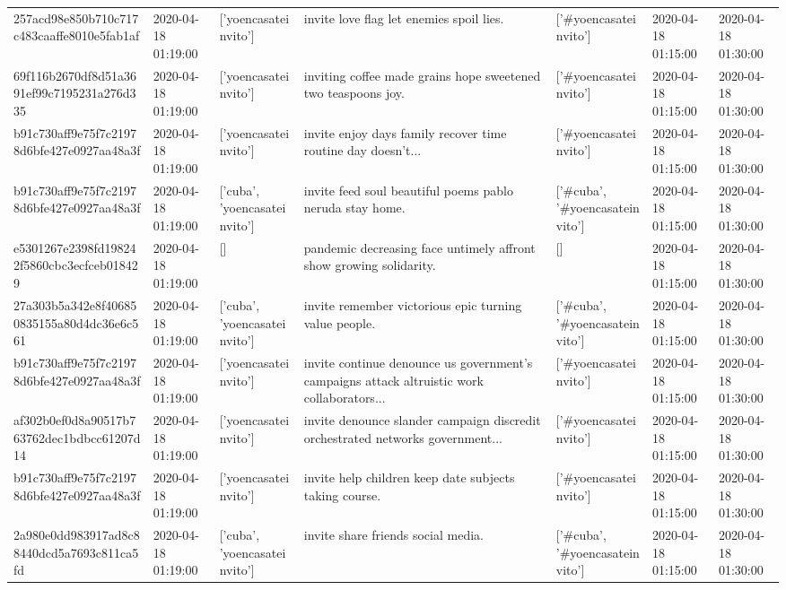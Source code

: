\begin{tabular}{lllllll}
257acd98e850b710c717c483caaffe8010e5fab1af & 2020-04-18 01:19:00 & ['yoencasateinvito'] & invite love flag let enemies spoil lies. & ['#yoencasateinvito'] & 2020-04-18 01:15:00 & 2020-04-18 01:30:00 \\
69f116b2670df8d51a3691ef99c7195231a276d335 & 2020-04-18 01:19:00 & ['yoencasateinvito'] & inviting coffee made grains hope sweetened two teaspoons joy. & ['#yoencasateinvito'] & 2020-04-18 01:15:00 & 2020-04-18 01:30:00 \\
b91c730aff9e75f7c21978d6bfe427e0927aa48a3f & 2020-04-18 01:19:00 & ['yoencasateinvito'] & invite enjoy days family recover time routine day doesn't... & ['#yoencasateinvito'] & 2020-04-18 01:15:00 & 2020-04-18 01:30:00 \\
b91c730aff9e75f7c21978d6bfe427e0927aa48a3f & 2020-04-18 01:19:00 & ['cuba', 'yoencasateinvito'] & invite feed soul beautiful poems pablo neruda stay home. & ['#cuba', '#yoencasateinvito'] & 2020-04-18 01:15:00 & 2020-04-18 01:30:00 \\
e5301267e2398fd198242f5860cbc3ecfceb018429 & 2020-04-18 01:19:00 & [] & pandemic decreasing face untimely affront show growing solidarity. & [] & 2020-04-18 01:15:00 & 2020-04-18 01:30:00 \\
27a303b5a342e8f406850835155a80d4dc36e6c561 & 2020-04-18 01:19:00 & ['cuba', 'yoencasateinvito'] & invite remember victorious epic turning value people. & ['#cuba', '#yoencasateinvito'] & 2020-04-18 01:15:00 & 2020-04-18 01:30:00 \\
b91c730aff9e75f7c21978d6bfe427e0927aa48a3f & 2020-04-18 01:19:00 & ['yoencasateinvito'] & invite continue denounce us government's campaigns attack altruistic work collaborators... & ['#yoencasateinvito'] & 2020-04-18 01:15:00 & 2020-04-18 01:30:00 \\
af302b0ef0d8a90517b763762dec1bdbcc61207d14 & 2020-04-18 01:19:00 & ['yoencasateinvito'] & invite denounce slander campaign discredit orchestrated networks government... & ['#yoencasateinvito'] & 2020-04-18 01:15:00 & 2020-04-18 01:30:00 \\
b91c730aff9e75f7c21978d6bfe427e0927aa48a3f & 2020-04-18 01:19:00 & ['yoencasateinvito'] & invite help children keep date subjects taking course. & ['#yoencasateinvito'] & 2020-04-18 01:15:00 & 2020-04-18 01:30:00 \\
2a980e0dd983917ad8c88440dcd5a7693c811ca5fd & 2020-04-18 01:19:00 & ['cuba', 'yoencasateinvito'] & invite share friends social media. & ['#cuba', '#yoencasateinvito'] & 2020-04-18 01:15:00 & 2020-04-18 01:30:00 \\

\end{tabular}

